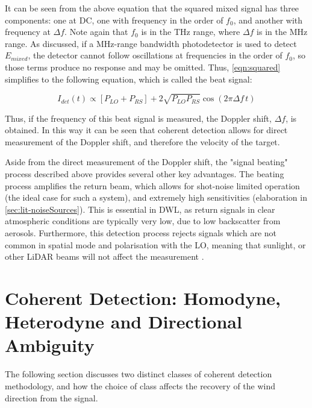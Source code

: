         It can be seen from the above equation that the squared mixed signal has three components: one at DC, one with frequency in the order of $f_0$, and another with frequency at $\Delta f$. Note again that $f_0$ is in the THz range, where $\Delta f$ is in the MHz range. As discussed, if a MHz-range bandwidth photodetector is used to detect $E_{mixed}$, the detector cannot follow oscillations at frequencies in the order of $f_{0}$, so those terms produce no response and may be omitted. Thus, \autoref{eqn:squared} simplifies to the following equation, which is called the beat signal:

        \begin{equation}
            I_{det}(t) \propto [P_{LO} + P_{RS}] + 2\sqrt{P_{LO}P_{RS}}\cos(2\pi \Delta f\, t)
            \label{eqn:beatSignal}
        \end{equation}

        Thus, if the frequency of this beat signal is measured, the Doppler shift, $\Delta f$, is obtained. In this way it can be seen that coherent detection allows for direct measurement of the Doppler shift, and therefore the velocity of the target. 

        Aside from the direct measurement of the Doppler shift, the "signal beating" process described above provides several other key advantages. The beating process amplifies the return beam, which allows for shot-noise limited operation (the ideal case for such a system), and extremely high sensitivities \cite{hill_remote_nodate} (elaboration in \ref{sec:lit-noiseSources}). This is essential in DWL, as return signals in clear atmospheric conditions are typically very low, due to low backscatter from aerosols. Furthermore, this detection process rejects signals which are not common in spatial mode and polarisation with the LO, meaning that sunlight, or other LiDAR beams will not affect the measurement \cite{hill_remote_nodate}. 
        

    \section{Coherent Detection: Homodyne, Heterodyne and Directional Ambiguity}
    \label{sec:lit-homohetero}
    
    The following section discusses two distinct classes of coherent detection methodology, and how the choice of class affects the recovery of the wind direction from the signal.

